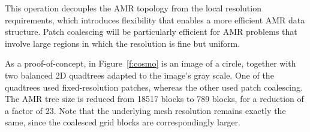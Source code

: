 \documentclass[11pt,letterpaper]{article}
\begin{document}



This operation decouples the AMR topology from the local resolution
requirements, which introduces flexibility that enables a more efficient AMR data structure.
Patch coalescing will be
particularly efficient for AMR problems that involve large regions in
which the resolution is fine but uniform.

As a proof-of-concept, in Figure~\ref{f:cosmo} is an image of a
circle, together with two balanced 2D quadtrees adapted to the image's
gray scale.  One of the quadtrees used fixed-resolution patches,
whereas the other used patch coalescing.  The AMR tree size is reduced
from 18517 blocks to 789 blocks, for a reduction of a factor of 23.
Note that the underlying mesh resolution remains exactly the same,
since the coalesced grid blocks are correspondingly larger.


\end{document}
